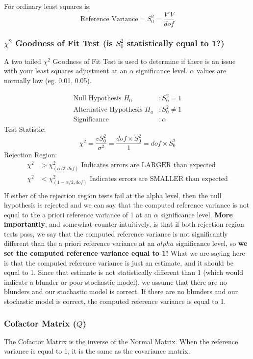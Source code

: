 For ordinary least squares is:
\[
\text{Reference Variance} = S_0^2 = \dfrac{V'V}{dof}
\]

\subsubsection*{$\chi^2$ Goodness of Fit Test (is $S_0^2$ statistically equal to 1?)}
A two tailed $\chi^2$ Goodness of Fit Test is used to determine if there is an issue with your least squares adjustment at an $\alpha$ significance level.  $\alpha$ values are normally low (eg. 0.01, 0.05).

\begin{align*}
\text{Null Hypothesis } H_0 &: S_0^2 = 1 \\
\text{Alternative Hypothesis } H_a &: S_0^2 \neq 1 \\
\text{Significance } &: \alpha
\end{align*}
Test Statistic:
\[
\chi^2 = \dfrac{vS_0^2}{\sigma^2} = \dfrac{dof\times S_0^2}{1} = dof\times S_0^2
\]
Rejection Region:
\begin{align*}
\chi^2 &> \chi_{(\alpha/2,dof)}^2 \text{ Indicates errors are LARGER than expected}\\
\chi^2 &< \chi_{(1-\alpha/2,dof)}^2 \text{ Indicates errors are SMALLER than expected}\\
\end{align*}
If either of the rejection region tests fail at the alpha level, then the null hypothesis is rejected and we can say that the computed reference variance is not equal to the a priori reference variance of 1 at an $\alpha$ significance level.  \textbf{More importantly}, and somewhat counter-intuitively, is that if both rejection region tests pass, we say that the computed reference variance is not significantly different than the a priori reference variance at an $alpha$ significance level, so \textbf{we set the computed reference variance equal to 1!}  What we are saying here is that the computed reference variance is just an estimate, and it should be equal to 1.  Since that estimate is not statistically different than 1 (which would indicate a blunder or poor stochastic model), we assume that there are no blunders and our stochastic model is correct.  If there are no blunders and our stochastic model is correct, the computed reference variance is equal to 1.
\subsubsection*{Cofactor Matrix ($Q$)}
The Cofactor Matrix is the inverse of the Normal Matrix.  When the reference variance is equal to 1, it is the same as the covariance matrix.  

